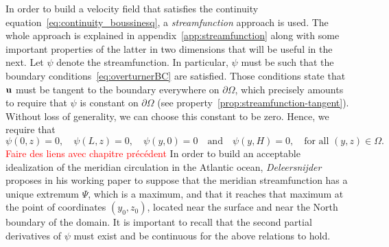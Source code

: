 In order to build a velocity field that satisfies the continuity equation~\eqref{eq:continuity_boussinesq}, a \textit{streamfunction} approach is used. The whole approach is explained in appendix~\ref{app:streamfunction} along with some important properties of the latter in two dimensions that will be useful in the next. Let $\psi$ denote the streamfunction. In particular, $\psi$ must be such that the boundary conditions~\eqref{eq:overturnerBC} are satisfied. Those conditions state that $\mathbf u$ must be tangent to the boundary everywhere on $\partial \Omega$, which precisely amounts to require that $\psi$ is constant on $\partial \Omega$ (see property~\ref{prop:streamfunction-tangent}). Without loss of generality, we can choose this constant to be zero. Hence, we require that 
\begin{equation}
	\psi(0,z) = 0, \quad \psi(L,z) = 0, \quad \psi(y,0) = 0 \quad \mbox{and} \quad \psi(y,H) = 0, \quad \mbox{for all $(y,z) \in \Omega$}.
\end{equation}
\textcolor{red}{Faire des liens avec chapitre précédent} In order to build an acceptable idealization of the meridian circulation in the Atlantic ocean, \textit{Deleersnijder} proposes in his working paper \cite{deleersnijder2006overturner} to suppose that the meridian streamfunction has a unique extremum $\Psi$, which is a maximum, and that it reaches that maximum at the point of coordinates $(y_0,z_0)$, located near the surface and near the North boundary of the domain. It is important to recall that the second partial derivatives of $\psi$ must exist and be continuous for the above relations to hold.

